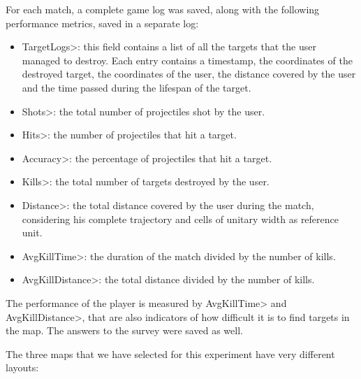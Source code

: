 For each match, a complete game log was saved, along with the following performance metrics, saved in a separate log:
\begin{itemize}
\item \<TargetLogs>: this field contains a list of all the targets that the user managed to destroy. Each entry contains a timestamp, the coordinates of the destroyed target, the coordinates of the user, the distance covered by the user and the time passed during the lifespan of the target.
\item \<Shots>: the total number of projectiles shot by the user.
\item \<Hits>: the number of projectiles that hit a target.
\item \<Accuracy>: the percentage of projectiles that hit a target.
\item \<Kills>: the total number of targets destroyed by the user.
\item \<Distance>: the total distance covered by the user during the match, considering his complete trajectory and cells of unitary width as reference unit.
\item \<AvgKillTime>: the duration of the match divided by the number of kills.
\item \<AvgKillDistance>: the total distance divided by the number of kills.
\end{itemize}

\noindent
The performance of the player is measured by \<AvgKillTime> and \<AvgKillDistance>, that are also indicators of how difficult it is to find targets in the map. The answers to the survey were saved as well.

\par

The three maps that we have selected for this experiment have very different layouts:

